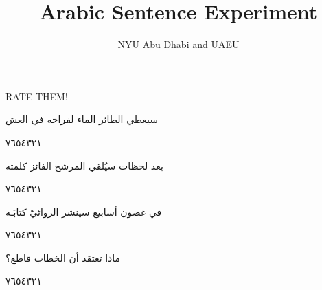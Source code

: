 \documentclass[11pt, a4paper]{article}
\begin{document}
	\title{Arabic Sentence Experiment}
	\author{NYU Abu Dhabi and UAEU}
	
	\maketitle
	
	{RATE THEM!}
	
	\vfill\clearpage
	
	{\begin{flushright}
\textarabic{سيعطي الطائر الماء لفراخه في العش}
\end{flushright}

\begin{center}
        \hfill\textarabic{٧}\hfill\textarabic{٦}\hfill\textarabic{٥}\hfill\textarabic{٤}\hfill\textarabic{٣}\hfill\textarabic{٢}\hfill\textarabic{١}
        \end{center}


\vspace{0.5\baselineskip}\begin{flushright}
\textarabic{بعد لحظات سيُلقي المرشح الفائز كلمته}
\end{flushright}

\begin{center}
        \hfill\textarabic{٧}\hfill\textarabic{٦}\hfill\textarabic{٥}\hfill\textarabic{٤}\hfill\textarabic{٣}\hfill\textarabic{٢}\hfill\textarabic{١}
        \end{center}


\vspace{0.5\baselineskip}\begin{flushright}
\textarabic{في غضون أسابيع سينشر الروائيّ كتابَـه}
\end{flushright}

\begin{center}
        \hfill\textarabic{٧}\hfill\textarabic{٦}\hfill\textarabic{٥}\hfill\textarabic{٤}\hfill\textarabic{٣}\hfill\textarabic{٢}\hfill\textarabic{١}
        \end{center}


\vspace{0.5\baselineskip}\begin{flushright}
\textarabic{ماذا تعتقد أن الخطاب قاطع؟}
\end{flushright}

\begin{center}
        \hfill\textarabic{٧}\hfill\textarabic{٦}\hfill\textarabic{٥}\hfill\textarabic{٤}\hfill\textarabic{٣}\hfill\textarabic{٢}\hfill\textarabic{١}
        \end{center}


}
\end{document}
